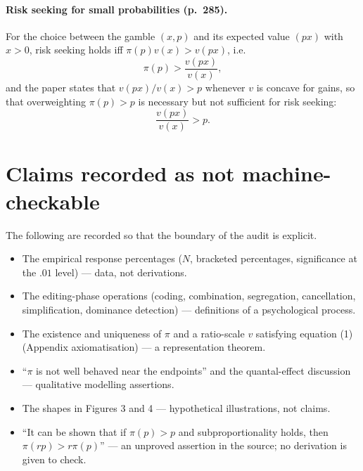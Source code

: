 \documentclass[11pt]{article}
\begin{document}
\paragraph{Risk seeking for small probabilities (p.~285).}
For the choice between the gamble $(x,p)$ and its expected value $(px)$ with $x>0$,
risk seeking holds iff $\pi(p)v(x) > v(px)$, i.e.
\begin{equation}\label{eq:riskseek}
\pi(p) > \frac{v(px)}{v(x)},
\end{equation}
and the paper states that $v(px)/v(x) > p$ whenever $v$ is concave for gains, so that
overweighting $\pi(p)>p$ is necessary but not sufficient for risk seeking:
\begin{equation}\label{eq:riskseek-necessary}
\frac{v(px)}{v(x)} > p .
\end{equation}

\section{Claims recorded as not machine-checkable}

The following are recorded so that the boundary of the audit is explicit.
\begin{itemize}
\item The empirical response percentages ($N$, bracketed percentages, significance
      at the $.01$ level) --- data, not derivations.
\item The editing-phase operations (coding, combination, segregation, cancellation,
      simplification, dominance detection) --- definitions of a psychological process.
\item The existence and uniqueness of $\pi$ and a ratio-scale $v$ satisfying
      equation (1) (Appendix axiomatisation) --- a representation theorem.
\item ``$\pi$ is not well behaved near the endpoints'' and the quantal-effect
      discussion --- qualitative modelling assertions.
\item The shapes in Figures 3 and 4 --- hypothetical illustrations, not claims.
\item ``It can be shown that if $\pi(p)>p$ and subproportionality holds, then
      $\pi(rp) > r\pi(p)$'' --- an unproved assertion in the source; no derivation
      is given to check.
\end{itemize}
\end{document}
